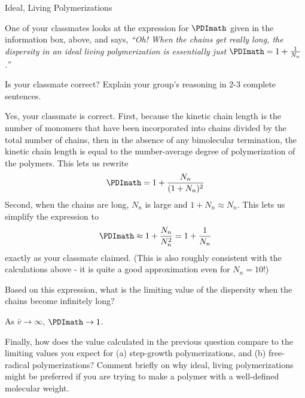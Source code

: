 \begin{activity}{Ideal, Living Polymerizations}
\begin{ctqs}
\begin{enumerate}
		\end{enumerate}
		
	\question One of your classmates looks at the expression for $\PDImath$ given in the information box, above, and says, \emph{``Oh!  When the chains get really long, the dispersity in an ideal living polymerization is essentially just $\PDImath = 1+\frac{1}{N_n}$.''}
	
		Is your classmate correct?  Explain your group's reasoning in 2-3 complete sentences.
		
		\begin{solution}[2in]
			Yes, your classmate is correct.  First, because the kinetic chain length is the number of monomers that have been incorporated into chains divided by the total number of chains, then in the absence of any bimolecular termination, the kinetic chain length is equal to the number-average degree of polymerization of the polymers.  This lets us rewrite
	\begin{equation*}
		\PDImath = 1+\frac{N_n}{(1+N_n)^2}
	\end{equation*}
			Second, when the chains are long, $N_n$ is large and $1+N_n \approx N_n$.  This lets us simplify the expression to 
	\begin{equation*}
		\PDImath \approx 1+\frac{N_n}{N_n^2} = 1+\frac{1}{N_n}
	\end{equation*}
	exactly as your classmate claimed. (This is also roughly consistent with the calculations above - it is quite a good approximation even for $N_n=10$!)
		\end{solution}
		
	\clearpage
	\question Based on this expression, what is the limiting value of the dispersity when the chains become infinitely long?
		
		\begin{solution}[0.5in]
			As $\bar v \to \infty$, $\PDImath \to 1$.
		\end{solution}
	
	\question Finally, how does the value calculated in the previous question compare to the limiting values you expect for (a) step-growth polymerizations, and (b) free-radical polymerizations?  Comment briefly on why ideal, living polymerizations might be preferred if you are trying to make a polymer with a well-defined molecular weight.
		

\end{ctqs}
\end{activity}
